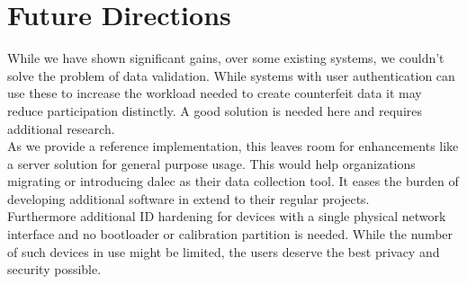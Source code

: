 %
\section{Future Directions}

    While we have shown significant gains, over some existing systems, we couldn't solve the problem of data validation. While systems with user authentication can use these to increase the workload needed to create counterfeit data it may reduce participation distinctly. A good solution is needed here and requires additional research.\\
    As we provide a reference implementation, this leaves room for enhancements like a server solution for general purpose usage. This would help organizations migrating or introducing dalec as their data collection tool. It eases the burden of developing additional software in extend to their regular projects.\\
    Furthermore additional ID hardening for devices with a single physical network interface and no bootloader or calibration partition is needed. While the number of such devices in use might be limited, the users deserve the best privacy and security possible.
    
